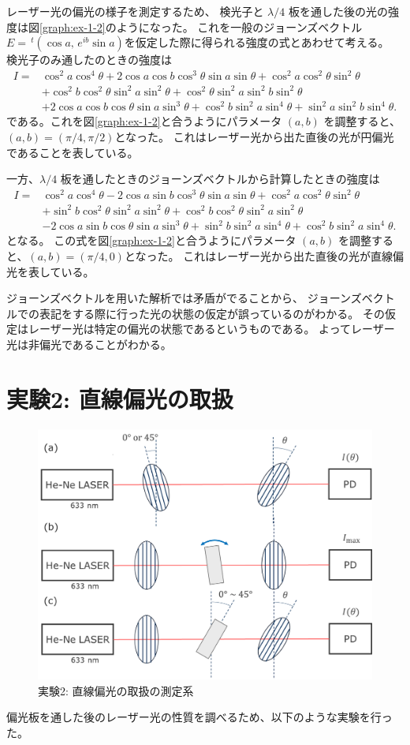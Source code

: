\documentclass[9pt,dvipdfmx,a4paper]{jsarticle}
\begin{document}
レーザー光の偏光の様子を測定するため、
検光子と \(\lambda/4\) 板を通した後の光の強度は図\ref{graph:ex-1-2}のようになった。
これを一般のジョーンズベクトル \(E = \,^t(\cos a,\,e^{ib}\sin a)\)を仮定した際に得られる強度の式とあわせて考える。
検光子のみ通したのときの強度は
\begin{align}
    I = &\cos^2 a \cos^4 \theta
    + 2 \cos a \cos b \cos^3 \theta \sin a \sin \theta
    + \cos^2 a \cos^2 \theta \sin^2 \theta \nonumber \\
    &+ \cos^2 b \cos^2 \theta \sin^2 a \sin^2 \theta
    + \cos^2 \theta \sin^2 a \sin^2 b \sin^2 \theta \nonumber \\
    &+ 2 \cos a \cos b \cos \theta \sin a \sin^3 \theta
    + \cos^2 b \sin^2 a \sin^4 \theta
    + \sin^2 a \sin^2 b \sin^4 \theta.
\end{align}
である。これを図\ref{graph:ex-1-2}と合うようにパラメータ \((a,b)\) を調整すると、\((a,b)=(\pi/4,\pi/2)\)となった。
これはレーザー光から出た直後の光が円偏光であることを表している。

一方、\(\lambda/4\) 板を通したときのジョーンズベクトルから計算したときの強度は
\begin{align}
    I =&\cos^2 a \cos^4 \theta
    - 2 \cos a \sin b \cos^3 \theta \sin a \sin \theta
    + \cos^2 a \cos^2 \theta \sin^2 \theta \nonumber \\
    &+ \sin^2 b \cos^2 \theta \sin^2 a \sin^2 \theta
    + \cos^2 b \cos^2 \theta \sin^2 a \sin^2 \theta \nonumber \\
    &- 2 \cos a \sin b \cos \theta \sin a \sin^3 \theta
    + \sin^2 b \sin^2 a \sin^4 \theta
    + \cos^2 b \sin^2 a \sin^4 \theta.
\end{align}
となる。
この式を図\ref{graph:ex-1-2}と合うようにパラメータ \((a,b)\) を調整すると、\((a,b)=(\pi/4,0)\)となった。
これはレーザー光から出た直後の光が直線偏光を表している。

ジョーンズベクトルを用いた解析では矛盾がでることから、
ジョーンズベクトルでの表記をする際に行った光の状態の仮定が誤っているのがわかる。
その仮定はレーザー光は特定の偏光の状態であるというものである。
よってレーザー光は非偏光であることがわかる。


\section{実験2: 直線偏光の取扱}
\begin{figure}
    \centering
    \includegraphics[width=0.48\columnwidth]{fig_ex-2.png}
    \caption{実験2: 直線偏光の取扱の測定系}
    \label{fig:ex-2}
\end{figure}
偏光板を通した後のレーザー光の性質を調べるため、以下のような実験を行った。
\end{document}
